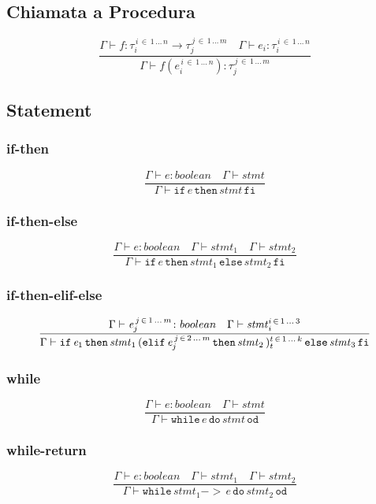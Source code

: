 \documentclass[a4paper,12pt]{article}
\newcommand\resw[1]{\mathtt{#1}}
\newcommand\mi[1]{\mathit{#1}}
\begin{document}
    \subsection{Chiamata a Procedura}
    \[
        \frac {\Gamma \vdash \mi{f} \colon \tau_i^{\,i \, \in \,1 \, \dots \, n} \to \tau_j^{\,j \, \in \, 1 \, \dots \, m} \quad \Gamma \vdash \mi{e_i} \colon %
        \tau_i^{\, i \, \in \, 1 \, \dots \, n}} %
        {\Gamma \vdash \mi{f}(\mi{e}_i^{\, i \, \in \, 1 \, \dots \, n})\colon \tau_j^{\, j \, \in \, 1 \, \dots \, m}}
    \]
    
    \subsection{Statement}
    	\subsubsection{if-then}
	\[
		\frac{\Gamma \vdash \mi{e} \colon boolean \quad \Gamma \vdash \mi{stmt}}%
		{\Gamma \vdash \resw{if} \, \mi{e} \, \resw{then} \, \mi{stmt} \, \resw{fi}}
	\]
	\subsubsection{if-then-else}
	\[
		\frac{\Gamma \vdash \mi{e} \colon boolean \quad \Gamma \vdash \mi{stmt}_{1} \quad \Gamma \vdash \mi{stmt}_{2}}%
		{\Gamma \vdash \resw{if} \, \mi{e} \, \resw{then} \, \mi{stmt}_{1} \, \resw{else} \, \mi{stmt}_{2} \, \resw{fi}}
	\]
	\subsubsection{if-then-elif-else}
	\[
		\frac{\Gamma \vdash \mi{e}_{j}^{\, j \, \in \, 1 \, \dots \, m} \colon boolean \quad %
		\Gamma \vdash \mi{stmt}_{i}^{i \, \in \, 1 \, \dots \, 3}}%
		{%
		\Gamma \vdash  \resw{if} \, \mi{e}_{1} \, \resw{then} \, \mi{stmt}_{1}  \,
		 (\resw{elif} \, \mi{e}_{j}^{\, j \, \in \, 2 \, \dots \, m} \, \resw{then} \, \mi{stmt}_{2}\,)_{t}^{t \, \in \, 1 \, \dots \, k} \,
		  \resw{else} \, \mi{stmt}_{3} \, \resw{fi}
		}%
	\]
	\subsubsection{while}
	\[
		\frac{\Gamma \vdash \mi{e} \colon boolean \quad \Gamma \vdash \mi{stmt}}%
		{\Gamma \vdash \resw{while} \, \mi{e} \, \resw{do}\, \mi{stmt} \, \resw{od}}
	\]
	\subsubsection{while-return}
	\[
		\frac{\Gamma \vdash \mi{e} \colon boolean \quad \Gamma \vdash \mi{stmt}_{1} \quad \Gamma \vdash \mi{stmt}_{2}}%
		{\Gamma \vdash \resw{while} \, \mi{stmt}_{1}  \resw{-\!\!>}\, \mi{e} \, \resw{do}\, \mi{stmt}_{2} \, \resw{od}}
	\]
\end{document}
